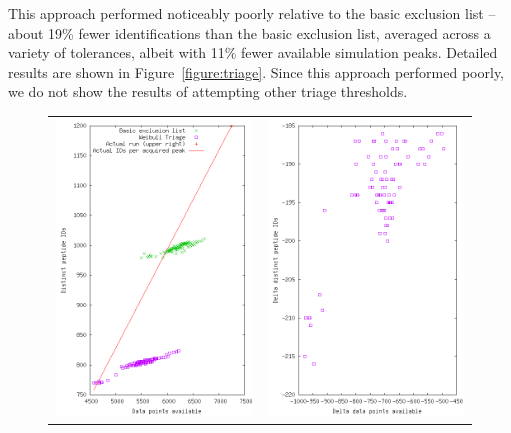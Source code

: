 \documentclass[12pt,twoside,openright]{report}
\begin{document}
This approach performed noticeably poorly relative to the basic exclusion list
-- about 19\% fewer identifications than the basic exclusion list, averaged
across a variety of tolerances, albeit with 11\% fewer available simulation
peaks. Detailed results are shown in Figure~\ref{figure:triage}. Since this
approach performed poorly, we do not show the results of attempting other triage
thresholds.

\begin{figure}
\centering
\begin{tabular}{cc}
\includegraphics[width=3.0in]{3_weib_triage2.png} &
\includegraphics[width=3.0in]{3b_weib_triage2.png} \\

\end{tabular}
\end{figure}
\end{document}
